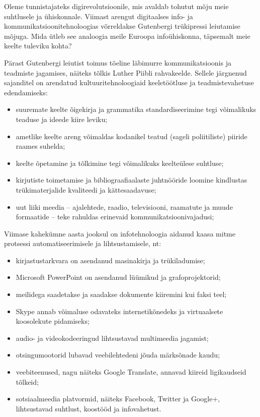 \begin{multicols}{2}
  Oleme tunnistajateks digirevolutsioonile, mis avaldab tohutut mõju meie suhtlusele ja ühiskonnale.  Viimast arengut digitaalses info- ja kommunikatsiooni\-tehno\-loogias võrreldakse Gutenbergi trükipressi leiutamise mõjuga.  Mida ütleb see ana\-loogia meile Euroopa infoühiskonna, täpsemalt meie keelte tuleviku kohta?


Pärast Gutenbergi leiutist toimus tõeline läbimurre kommunikatsioonis ja teadmiste jagamises, näiteks tõlkis Luther Piib\-li rahvakeelde. 
Sellele järgnenud sajanditel on arendatud kultuuritehnoloogiaid keeletöötluse ja teadmistevahetuse edendamiseks:

\begin{itemize}
\item suuremate keelte õigekirja ja grammatika standardiseerimine tegi võimalikuks teaduse ja ideede kiire leviku;
\item ametlike keelte areng võimaldas kodanikel teatud (sageli poliitiliste) pii\-ride raames suhelda;
\item keelte õpetamine ja tõlkimine tegi võimalikuks keelteülese suhtluse;
\item kirjutiste toimetamise ja bibliograafia\-alaste juhtnööride loomine kindlustas trükimaterjalide kvaliteedi ja kättesaadavuse;
\item uut liiki meedia -- ajalehtede, raadio, televisiooni, raamatute ja muude formaatide -- teke rahuldas erinevaid kommunikatsiooni\-vajadusi; 
\end{itemize}

Viimase kahekümne aasta jooksul on info\-tehnoloogia aidanud kaasa mitme protsessi automatiseerimisele ja lihtsustamisele, nt:

\begin{itemize}
\item kirjastustarkvara on asendanud masi\-na\-kirja ja trükiladumise;
\item Microsoft PowerPoint on asendanud lüümikud ja grafoprojektorid;
\item meilidega saadetakse ja saadakse dokumente kiiremini kui faksi teel;
\item Skype annab võimaluse odavateks internetikõnedeks ja virtuaalsete koosolekute pidamiseks;
\item audio- ja videokodeeringud lihtsustavad multimeedia jagamist;
\item otsingumootorid lubavad veebilehtedeni jõuda märksõnade kaudu;
\item veebiteenused, nagu näiteks Google Translate, annavad kiireid ligikaudseid tõlkeid;
\item sotsiaalmeedia platvormid, näiteks Facebook, Twitter ja Google+, lihtsustavad suhtlust, koostööd ja infovahetust.  
\end{itemize}


\end{multicols}
